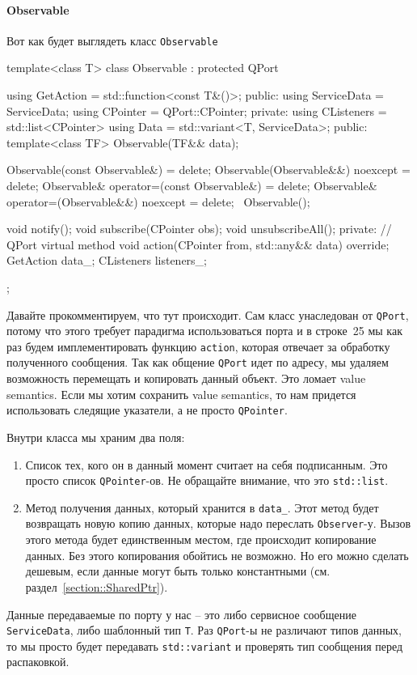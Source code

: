 \paragraph{Observable}

Вот как будет выглядеть класс \verb"Observable"
\begin{cppcode}
template<class T>
class Observable : protected QPort {
  using GetAction = std::function<const T&()>;
public:
  using ServiceData = ServiceData;
  using CPointer = QPort::CPointer;
private:
  using CListeners = std::list<CPointer>
  using Data = std::variant<T, ServiceData>;
public:
  template<class TF>
  Observable(TF&& data);
  
  Observable(const Observable&) = delete;
  Observable(Observable&&) noexcept = delete;
  Observable& operator=(const Observable&) = delete;
  Observable& operator=(Observable&&) noexcept = delete;
  ~Observable();
  
  void notify();
  void subscribe(CPointer obs);
  void unsubscribeAll();
private:
  // QPort virtual method
  void action(CPointer from, std::any&& data) override;
  GetAction data_;
  CListeners listeners_;
};
\end{cppcode}
Давайте прокомментируем, что тут происходит.
Сам класс унаследован от \verb"QPort", потому что этого требует парадигма использоваться порта и в строке~25 мы как раз будем имплементировать функцию \verb"action", которая отвечает за обработку полученного сообщения.
Так как общение \verb"QPort" идет по адресу, мы удаляем возможность перемещать и копировать данный объект.
Это ломает value semantics.
Если мы хотим сохранить value semantics, то нам придется использовать следящие указатели, а не просто \verb"QPointer".

Внутри класса мы храним два поля:
\begin{enumerate}
\item
Список тех, кого он в данный момент считает на себя подписанным.
Это просто список \verb"QPointer"-ов.
Не обращайте внимание, что это \verb"std::list".

\item Метод получения данных, который хранится в \verb"data_".
Этот метод будет возвращать новую копию данных, которые надо переслать \verb"Observer"-у.
Вызов этого метода будет единственным местом, где происходит копирование данных.
Без этого копирования обойтись не возможно.
Но его можно сделать дешевым, если данные могут быть только константными (см. раздел~\ref{section::SharedPtr}).
\end{enumerate}
Данные передаваемые по порту у нас -- это либо сервисное сообщение \verb"ServiceData", либо шаблонный тип \verb"T".
Раз \verb"QPort"-ы не различают типов данных, то мы просто будет передавать \verb"std::variant" и проверять тип сообщения перед распаковкой.

